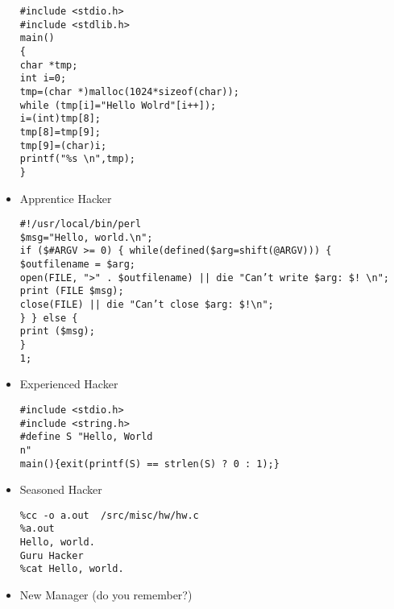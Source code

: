 \begin{itemize}
\texttt{\#include <stdio.h>\\
\#include <stdlib.h>\\
main()\\
\{\\
char *tmp;\\
int i=0;\\
tmp=(char *)malloc(1024*sizeof(char));\\
while (tmp[i]="Hello Wolrd"[i++]);\\
i=(int)tmp[8];\\
tmp[8]=tmp[9];\\
tmp[9]=(char)i;\\
printf("\%s \textbackslash n",tmp);\\
\}\\
}

	\item Apprentice Hacker

\texttt{\#!/usr/local/bin/perl\\
\$msg="Hello, world.\textbackslash n";\\
if (\$\#ARGV >= 0) \{
while(defined(\$arg=shift(@ARGV))) \{\\
\$outfilename = \$arg;\\
open(FILE, ">" . \$outfilename) || die "Can't write \$arg: \$! \textbackslash n";\\
print (FILE \$msg);\\
close(FILE) || die "Can't close \$arg: \$!\textbackslash n";\\
\}
\} else \{\\
print (\$msg);\\
\}\\
1;}

	\item Experienced Hacker

\texttt{\#include <stdio.h>\\
\#include <string.h>\\
\#define S "Hello, World\\n"\\
main()\{exit(printf(S) == strlen(S) ? 0 : 1);\}}

	\item Seasoned Hacker

\texttt{\%cc -o a.out ~/src/misc/hw/hw.c\\
\%a.out\\
Hello, world.\\
Guru Hacker\\
\%cat
Hello, world.}

	\item New Manager (do you remember?)


\end{itemize}
